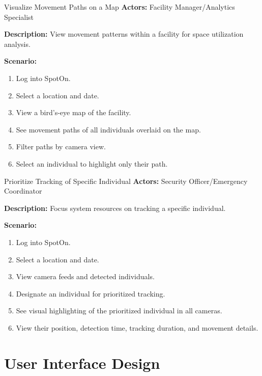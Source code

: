 \begin{usecase}{Visualize Movement Paths on a Map}
    \textbf{Actors:} Facility Manager/Analytics Specialist

    \textbf{Description:} View movement patterns within a facility for space utilization analysis.

    \textbf{Scenario:}
    \begin{enumerate}[leftmargin=80pt]
        \item Log into SpotOn.
        \item Select a location and date.
        \item View a bird's-eye map of the facility.
        \item See movement paths of all individuals overlaid on the map.
        \item Filter paths by camera view.
        \item Select an individual to highlight only their path.
    \end{enumerate}
\end{usecase}

\begin{usecase}{Prioritize Tracking of Specific Individual}
    \textbf{Actors:} Security Officer/Emergency Coordinator

    \textbf{Description:} Focus system resources on tracking a specific individual.

    \textbf{Scenario:}
    \begin{enumerate}[leftmargin=80pt]
        \item Log into SpotOn.
        \item Select a location and date.
        \item View camera feeds and detected individuals.
        \item Designate an individual for prioritized tracking.
        \item See visual highlighting of the prioritized individual in all cameras.
        \item View their position, detection time, tracking duration, and movement details.
    \end{enumerate}
\end{usecase}


\section{User Interface Design}
\label{section:user-interface-design}

